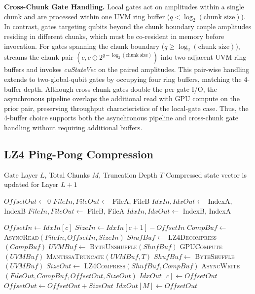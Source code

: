 \noindent\textbf{Cross-Chunk Gate Handling.} Local gates act on amplitudes within a single chunk and are processed within one UVM ring buffer ($q < \log_2(\text{chunk size})$). In contrast, gates targeting qubits beyond the chunk boundary couple amplitudes residing in different chunks, which must be co-resident in memory before invocation. For gates spanning the chunk boundary ($q \geq \log_2(\text{chunk size})$), \EdgeQuantum streams the chunk pair $(c, c \oplus 2^{q-\log_2(\text{chunk size})})$ into two adjacent UVM ring buffers and invokes \textit{cuStateVec} on the paired amplitudes. This pair-wise handling extends to two-global-qubit gates by occupying four ring buffers, matching the 4-buffer depth. Although cross-chunk gates double the per-gate I/O, the asynchronous pipeline overlaps the additional read with GPU compute on the prior pair, preserving throughput characteristics of the local-gate case. Thus, the 4-buffer choice supports both the asynchronous pipeline and cross-chunk gate handling without requiring additional buffers.





\subsection{LZ4 Ping-Pong Compression}
\label{design_compression}
\begin{algorithm}[t]
\caption{Dynamic Ping-Pong Compression Strategy}
\scriptsize
\label{alg:pingpong}
\begin{algorithmic}[1]
\Require Gate Layer $L$, Total Chunks $M$, Truncation Depth $T$
\Ensure Compressed state vector is updated for Layer $L+1$

\State $OffsetOut \gets 0$
 
    \State $FileIn, FileOut \gets$ FileA, FileB
    \State $IdxIn, IdxOut \gets$ IndexA, IndexB
\Else
    \State $FileIn, FileOut \gets$ FileB, FileA
    \State $IdxIn, IdxOut \gets$ IndexB, IndexA
\EndIf

    \State $OffsetIn \gets IdxIn[c]$ 
    \State $SizeIn \gets IdxIn[c+1] - OffsetIn$
    \State $CompBuf \gets$ \textsc{AsyncRead}$(FileIn, OffsetIn, SizeIn)$
    \State $ShufBuf \gets$ \textsc{LZ4Decompress}$(CompBuf)$ 
    \State $UVMBuf \gets$ \textsc{ByteUnshuffle}$(ShufBuf)$ 
    \State \textsc{GPUCompute}$(UVMBuf)$ 
    \State \textsc{MantissaTruncate}$(UVMBuf, T)$ 
    \State $ShufBuf \gets$ \textsc{ByteShuffle}$(UVMBuf)$ 
    \State $SizeOut \gets$ \textsc{LZ4Compress}$(ShufBuf, CompBuf)$ 
    \State \textsc{AsyncWrite}$(FileOut, CompBuf, OffsetOut, SizeOut)$ 
    \State $IdxOut[c] \gets OffsetOut$ 
    \State $OffsetOut \gets OffsetOut + SizeOut$
\EndFor
\State $IdxOut[M] \gets OffsetOut$ 

\end{algorithmic}
\end{algorithm}
 

